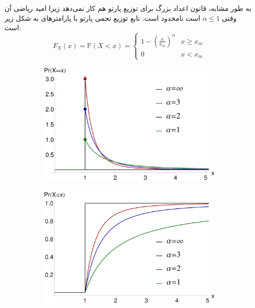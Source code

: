 \documentclass[a4paper]{article}
\begin{document}
به طور مشابه، قانون اعداد بزرگ برای توزیع پارتو هم کار نمی‌دهد زیرا امید ریاضی آن وقتی 
$ \alpha \leq 1 $
است نامحدود است.
تابع توزیع تجمی پارتو با پارامتر‌های 
به شکل زیر است:
\begin{equation*}
	F_{X}(x) = \mathbb{P}(X<x) = \begin{cases}
		1 - (\frac{x}{x_{m}})^{\alpha} & x \geq x_{m} \\
		0 & x < x_{m}
	\end{cases}
\end{equation*}
\begin{figure}[H]
	\centering
	\begin{subfigure}{.5\textwidth}
		\centering
		\includegraphics[width=.9\linewidth]{Pareto}
		\caption{
		}
	\end{subfigure}%
	\begin{subfigure}{.5\textwidth}
		\centering
		\includegraphics[width=.9\linewidth]{Pareto2}
		\caption{
		}
	\end{subfigure}
	\caption{}
\end{figure}
\end{document}
